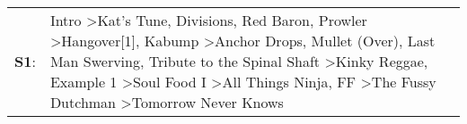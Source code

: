 \begin{supertabular}{p{0.03\textwidth}p{0.92\textwidth}}
 \textbf{S1}:  &  Intro\textsuperscript{} \textgreater \enspace Kat's Tune\textsuperscript{}, \enspace Divisions\textsuperscript{}, \enspace Red Baron\textsuperscript{}, \enspace Prowler\textsuperscript{} \textgreater \enspace Hangover[1]\textsuperscript{}, \enspace Kabump\textsuperscript{} \textgreater \enspace Anchor Drops\textsuperscript{}, \enspace Mullet (Over)\textsuperscript{}, \enspace Last Man Swerving\textsuperscript{}, \enspace Tribute to the Spinal Shaft\textsuperscript{} \textgreater \enspace Kinky Reggae\textsuperscript{}, \enspace Example 1\textsuperscript{} \textgreater \enspace Soul Food I\textsuperscript{} \textgreater \enspace All Things Ninja\textsuperscript{}, \enspace FF\textsuperscript{} \textgreater \enspace The Fussy Dutchman\textsuperscript{} \textgreater \enspace Tomorrow Never Knows\textsuperscript{}  \enspace  \\
\end{supertabular}
